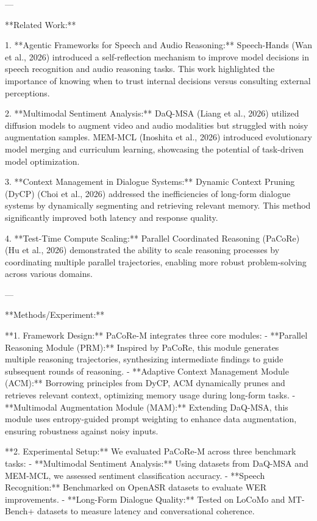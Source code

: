 ---

**Related Work:**  

1. **Agentic Frameworks for Speech and Audio Reasoning:**  
   Speech-Hands (Wan et al., 2026) introduced a self-reflection mechanism to improve model decisions in speech recognition and audio reasoning tasks. This work highlighted the importance of knowing when to trust internal decisions versus consulting external perceptions.

2. **Multimodal Sentiment Analysis:**  
   DaQ-MSA (Liang et al., 2026) utilized diffusion models to augment video and audio modalities but struggled with noisy augmentation samples. MEM-MCL (Inoshita et al., 2026) introduced evolutionary model merging and curriculum learning, showcasing the potential of task-driven model optimization.

3. **Context Management in Dialogue Systems:**  
   Dynamic Context Pruning (DyCP) (Choi et al., 2026) addressed the inefficiencies of long-form dialogue systems by dynamically segmenting and retrieving relevant memory. This method significantly improved both latency and response quality.

4. **Test-Time Compute Scaling:**  
   Parallel Coordinated Reasoning (PaCoRe) (Hu et al., 2026) demonstrated the ability to scale reasoning processes by coordinating multiple parallel trajectories, enabling more robust problem-solving across various domains.

---

**Methods/Experiment:**  

**1. Framework Design:**  
PaCoRe-M integrates three core modules:  
- **Parallel Reasoning Module (PRM):** Inspired by PaCoRe, this module generates multiple reasoning trajectories, synthesizing intermediate findings to guide subsequent rounds of reasoning.  
- **Adaptive Context Management Module (ACM):** Borrowing principles from DyCP, ACM dynamically prunes and retrieves relevant context, optimizing memory usage during long-form tasks.  
- **Multimodal Augmentation Module (MAM):** Extending DaQ-MSA, this module uses entropy-guided prompt weighting to enhance data augmentation, ensuring robustness against noisy inputs.

**2. Experimental Setup:**  
We evaluated PaCoRe-M across three benchmark tasks:
- **Multimodal Sentiment Analysis:** Using datasets from DaQ-MSA and MEM-MCL, we assessed sentiment classification accuracy.  
- **Speech Recognition:** Benchmarked on OpenASR datasets to evaluate WER improvements.  
- **Long-Form Dialogue Quality:** Tested on LoCoMo and MT-Bench+ datasets to measure latency and conversational coherence.

